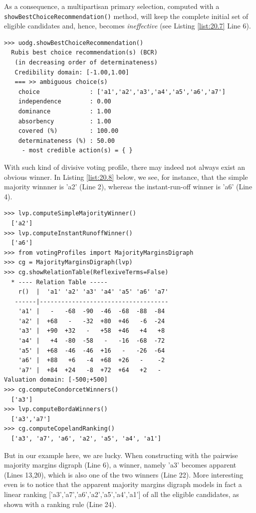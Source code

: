 As a consequence, a multipartisan primary selection, computed with a \texttt{showBestChoiceRecommendation()} method,  will keep the complete initial set of eligible candidates and, hence, becomes \emph{ineffective} (see Listing \ref{list:20.7} Line 6).
\begin{lstlisting}[caption={Example of ineffective primary multipartisan selection},label=list:20.7]
>>> uodg.showBestChoiceRecommendation()
  Rubis best choice recommendation(s) (BCR)
   (in decreasing order of determinateness)   
   Credibility domain: [-1.00,1.00]
   === >> ambiguous choice(s)
    choice              : ['a1','a2','a3','a4','a5','a6','a7']
    independence        : 0.00
    dominance           : 1.00
    absorbency          : 1.00
    covered (%)         : 100.00
    determinateness (%) : 50.00
     - most credible action(s) = { }
\end{lstlisting}

With such kind of divisive voting profile, there may indeed not always exist an obvious winner. In Listing \ref{list:20.8} below, we see, for instance, that the simple majority winnner is 'a2' (Line 2), whereas the instant-run-off winner is 'a6' (Line 4).
\begin{lstlisting}[caption={Example of non obvious secondary selection},label=list:20.8]
>>> lvp.computeSimpleMajorityWinner()
  ['a2']
>>> lvp.computeInstantRunoffWinner()
  ['a6']
>>> from votingProfiles import MajorityMarginsDigraph
>>> cg = MajorityMarginsDigraph(lvp)
>>> cg.showRelationTable(ReflexiveTerms=False)
  * ---- Relation Table -----
    r()  |  'a1' 'a2' 'a3' 'a4' 'a5' 'a6' 'a7'	  
   ------|------------------------------------
    'a1' |   -   -68  -90  -46  -68  -88  -84	 
    'a2' |  +68   -   -32  +80  +46   -6  -24	 
    'a3' |  +90  +32   -   +58  +46   +4   +8	 
    'a4' |   +4  -80  -58   -   -16  -68  -72	 
    'a5' |  +68  -46  -46  +16	 -   -26  -64	 
    'a6' |  +88   +6   -4  +68	+26   -    -2	 
    'a7' |  +84  +24   -8  +72	+64   +2   - 	 
Valuation domain: [-500;+500]
>>> cg.computeCondorcetWinners()
  ['a3']
>>> lvp.computeBordaWinners()
  ['a3','a7']
>>> cg.computeCopelandRanking()
  ['a3', 'a7', 'a6', 'a2', 'a5', 'a4', 'a1']
\end{lstlisting}
But in our example here, we are lucky. When constructing with the pairwise majority margins digraph (Line 6), a \Condorcet winner, namely 'a3' becomes apparent (Lines 13,20), which is also one of the two \Borda winners (Line 22). More interesting even is to notice that the apparent majority margins digraph models in fact a linear ranking ['a3','a7','a6','a2','a5','a4','a1'] of all the eligible candidates, as shown with a \Copeland ranking rule (Line 24).

